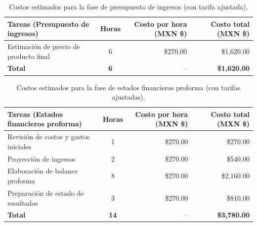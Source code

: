 \begin{table}[H]
	\centering
	\renewcommand{\arraystretch}{1.6}
	\setlength{\tabcolsep}{10pt}
	\Huge
	\begin{adjustbox}{max width=\textwidth}
		\begin{tabular}{|p{9.5cm}|c|r|r|}
			\hline
			\textbf{Tareas (Presupuesto de ingresos)} & \textbf{Horas} & \textbf{Costo por hora (MXN \$)} & \textbf{Costo total (MXN \$)} \\ \hline
			Estimación de precio de producto final & 6 & \$270.00 & \$1,620.00 \\ \hline
			\textbf{Total} & \textbf{6} & -- & \textbf{\$1,620.00} \\ \hline
		\end{tabular}
	\end{adjustbox}
	\caption{Costos estimados para la fase de presupuesto de ingresos (con tarifa ajustada).}
	\label{tab:costos_presupuesto_ingresos_s}
\end{table}

\begin{table}[H]
	\centering
	\renewcommand{\arraystretch}{1.6}
	\setlength{\tabcolsep}{10pt}
	\Huge
	\begin{adjustbox}{max width=\textwidth}
		\begin{tabular}{|p{9.5cm}|c|r|r|}
			\hline
			\textbf{Tareas (Estados financieros proforma)} & \textbf{Horas} & \textbf{Costo por hora (MXN \$)} & \textbf{Costo total (MXN \$)} \\ \hline
			Revisión de costos y gastos iniciales & 1 & \$270.00 & \$270.00 \\ \hline
			Proyección de ingresos & 2 & \$270.00 & \$540.00 \\ \hline
			Elaboración de balance proforma & 8 & \$270.00 & \$2,160.00 \\ \hline
			Preparación de estado de resultados & 3 & \$270.00 & \$810.00 \\ \hline
			\textbf{Total} & \textbf{14} & -- & \textbf{\$3,780.00} \\ \hline
		\end{tabular}
	\end{adjustbox}
	\caption{Costos estimados para la fase de estados financieros proforma (con tarifas ajustadas).}
	\label{tab:costos_financieros_proforma}
\end{table}

